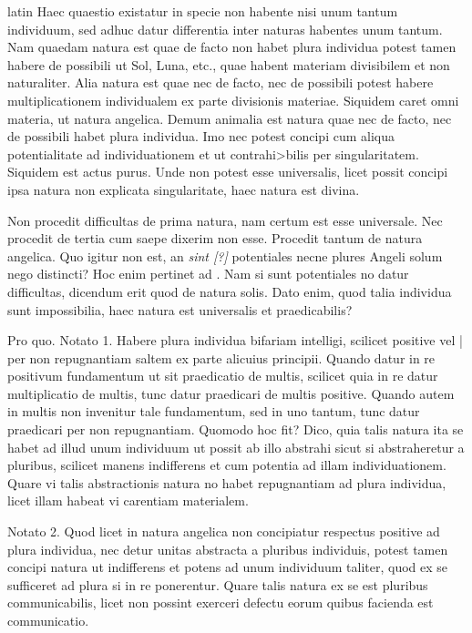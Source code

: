\begin{otherlanguage*}{latin}
\pstart
 Haec quaestio existatur in specie non habente nisi unum tantum individuum, sed adhuc datur differentia inter naturas habentes unum tantum. Nam quaedam natura est quae de facto non habet plura individua potest tamen habere de possibili ut Sol, Luna, etc., quae habent materiam divisibilem et non naturaliter. Alia natura est quae nec de facto, nec de possibili potest habere multiplicationem individualem ex parte divisionis materiae. Siquidem caret omni materia, ut natura angelica. Demum animalia est natura quae nec de facto, nec de possibili habet plura individua. Imo nec potest concipi cum aliqua potentialitate ad individuationem et ut contrahi>bilis per singularitatem. Siquidem est actus purus. Unde non potest esse universalis, licet possit concipi ipsa natura non explicata singularitate, haec natura est divina. 
\pend

\pstart
 Non procedit difficultas de prima natura, nam certum est esse universale. Nec procedit de tertia cum saepe dixerim non esse. Procedit tantum de natura angelica. Quo igitur non est, an \emph{sint [?]} potentiales necne plures Angeli solum nego distincti? Hoc enim pertinet ad . Nam si sunt potentiales no datur difficultas, dicendum erit quod de natura solis. Dato enim, quod talia individua sunt impossibilia, haec natura est universalis et praedicabilis? 
\pend

\pstart
 Pro quo. Notato 1. Habere plura individua bifariam intelligi, scilicet positive vel \textnormal{|}   per non repugnantiam saltem ex parte alicuius principii. Quando datur in re positivum fundamentum ut sit praedicatio de multis, scilicet quia in re datur multiplicatio de multis, tunc datur praedicari de multis positive. Quando autem in multis non invenitur tale fundamentum, sed in uno tantum, tunc datur praedicari per non repugnantiam. Quomodo hoc fit? Dico, quia talis natura ita se habet ad illud unum individuum ut possit ab illo abstrahi sicut si abstraheretur a pluribus, scilicet manens indifferens et cum potentia ad illam individuationem. Quare vi talis abstractionis natura no habet repugnantiam ad plura individua, licet illam habeat vi carentiam materialem. 
\pend

\pstart
 Notato 2. Quod licet in natura angelica non concipiatur respectus positive ad plura individua, nec detur unitas abstracta a pluribus individuis, potest tamen concipi natura ut indifferens et potens ad unum individuum taliter, quod ex se sufficeret ad plura si in re ponerentur. Quare talis natura ex se est pluribus communicabilis, licet non possint exerceri defectu eorum quibus facienda est communicatio. 
\pend


\end{otherlanguage*}
